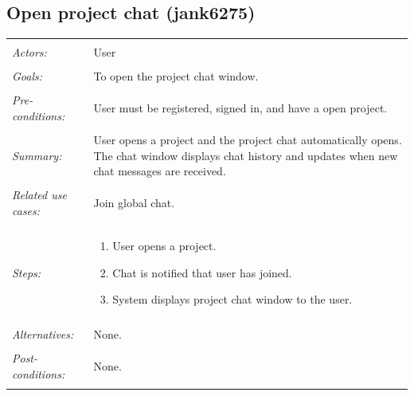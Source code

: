 \documentclass[11pt]{report}
\begin{document}
\subsection{Open project chat (jank6275)}
\begin{tabular}{ p{2cm} p{12cm} }
 \hline
 \\
 \textit{Actors:} & User \\ 
 \\
 \textit{Goals:} & To open the project chat window. \\
 \\
 \textit{Pre-conditions:} & User must be registered, signed in, and have a open project.  \\
 \\
 \textit{Summary:} & User opens a project and the project chat automatically opens. The chat window displays chat history and updates when new chat messages are received. \\ 
 \\
 \textit{Related use cases:} & Join global chat. \\ 
 \\
 \textit{Steps:} & \begin{enumerate}
  \item User opens a project.
  \item Chat is notified that user has joined.
  \item System displays project chat window to the user.
 \end{enumerate} \\
 \\
 \textit{Alternatives:} & None. \\
 \\
 \textit{Post-conditions:} & None. \\
 \\
\hline
\end{tabular}
\end{document}

